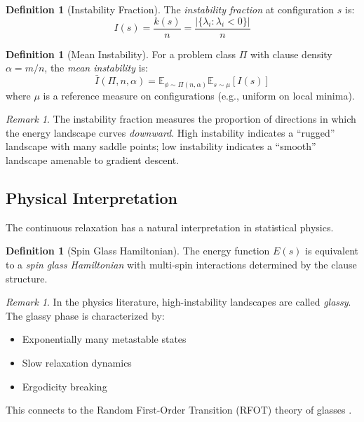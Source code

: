 \documentclass[11pt,a4paper]{article}
\theoremstyle{plain}
\theoremstyle{definition}
\newtheorem{definition}[theorem]{Definition}
\theoremstyle{remark}
\newtheorem{remark}[theorem]{Remark}
\newcommand{\E}{\mathbb{E}}
\newcommand{\Inst}{\bar{I}}
\begin{document}
\begin{definition}[Instability Fraction]\label{def:instability}
The \emph{instability fraction} at configuration $s$ is:
\begin{equation}
    I(s) = \frac{k(s)}{n} = \frac{|\{\lambda_i : \lambda_i < 0\}|}{n}
\end{equation}
\end{definition}

\begin{definition}[Mean Instability]\label{def:mean_instability}
For a problem class $\Pi$ with clause density $\alpha = m/n$, the \emph{mean instability} is:
\begin{equation}
    \Inst(\Pi, n, \alpha) = \E_{\phi \sim \Pi(n,\alpha)} \E_{s \sim \mu} [I(s)]
\end{equation}
where $\mu$ is a reference measure on configurations (e.g., uniform on local minima).
\end{definition}

\begin{remark}
The instability fraction measures the proportion of directions in which the energy landscape curves \emph{downward}. High instability indicates a ``rugged'' landscape with many saddle points; low instability indicates a ``smooth'' landscape amenable to gradient descent.
\end{remark}

\subsection{Physical Interpretation}

The continuous relaxation has a natural interpretation in statistical physics.

\begin{definition}[Spin Glass Hamiltonian]
The energy function $E(s)$ is equivalent to a \emph{spin glass Hamiltonian} with multi-spin interactions determined by the clause structure.
\end{definition}

\begin{remark}
In the physics literature, high-instability landscapes are called \emph{glassy}. The glassy phase is characterized by:
\begin{itemize}
    \item Exponentially many metastable states
    \item Slow relaxation dynamics
    \item Ergodicity breaking
\end{itemize}
This connects to the Random First-Order Transition (RFOT) theory of glasses \cite{kirkpatrick1987}.
\end{remark}
\end{document}
